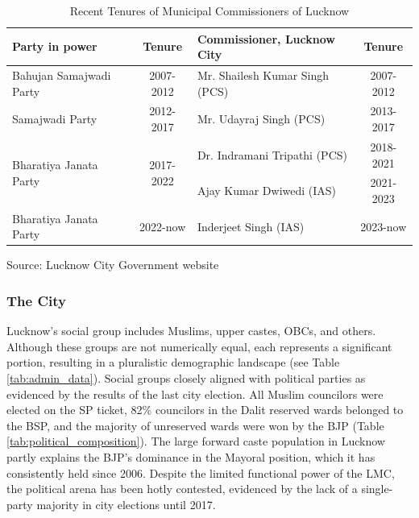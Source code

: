 \begin{table}[ht]
\centering
\caption{Recent Tenures of Municipal Commissioners of Lucknow}
\label{tab:commissioner_tenures}
\begin{tabular}{|p{4cm}|c|p{5cm}|c|}
\hline
\textbf{Party in power} & \textbf{Tenure} & \textbf{Commissioner, Lucknow City} & \textbf{Tenure} \\
\hline
Bahujan Samajwadi Party & 2007-2012 & Mr. Shailesh Kumar Singh (PCS) & 2007-2012 \\
\hline
Samajwadi Party & 2012-2017 & Mr. Udayraj Singh (PCS) & 2013-2017 \\
\hline
\multirow{2}{*}{Bharatiya Janata Party} & \multirow{2}{*}{2017-2022} & Dr. Indramani Tripathi (PCS) & 2018-2021 \\
\cline{3-4}
 & & Ajay Kumar Dwiwedi (IAS) & 2021-2023 \\
\hline
Bharatiya Janata Party & 2022-now & Inderjeet Singh (IAS) & 2023-now \\
\hline
\end{tabular}
\raggedright
\small Source: Lucknow City Government website
\end{table}

\subsubsection{The City}

Lucknow's social group includes Muslims, upper castes, OBCs, and others. Although these groups are not numerically equal, each represents a significant portion, resulting in a pluralistic demographic landscape (see Table \ref{tab:admin_data}). Social groups closely aligned with political parties as evidenced by the results of the last city election. All Muslim councilors were elected on the SP ticket, 82\% councilors in the Dalit reserved wards belonged to the BSP, and the majority of unreserved wards were won by the BJP (Table \ref{tab:political_composition}). The large forward caste population in Lucknow partly explains the BJP's dominance in the Mayoral position, which it has consistently held since 2006. Despite the limited functional power of the LMC, the political arena has been hotly contested, evidenced by the lack of a single-party majority in city elections until 2017.

